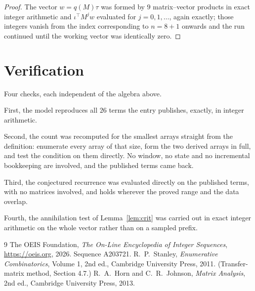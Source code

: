 \documentclass[11pt,a4paper]{article}
\theoremstyle{plain}
\theoremstyle{definition}
\begin{document}
\begin{proof}
The vector $w=q(M)\tau$ was formed by $9$ matrix--vector products in exact integer
arithmetic and $\iota^{\!\top}M^{j}w$ evaluated for $j=0,1,\dots$, again exactly; those
integers vanish from the index corresponding to $n=8+1$ onwards and the run continued
until the working vector was identically zero.
\end{proof}

\section{Verification}

Four checks, each independent of the algebra above.

First, the model reproduces all $26$ terms the entry publishes, exactly, in integer
arithmetic.

Second, the count was recomputed for the smallest arrays straight from the definition:
enumerate every array of that size, form the two derived arrays in full, and test the condition
on them directly. No window, no state and no incremental bookkeeping are involved, and the
published terms came back.

Third, the conjectured recurrence was evaluated directly on the published terms, with no
matrices involved, and holds wherever the proved range and the data overlap.

Fourth, the annihilation test of Lemma~\ref{lem:crit} was carried out in exact integer
arithmetic on the whole vector rather than on a sampled prefix.

\begin{thebibliography}{9}
 The OEIS Foundation, \emph{The On-Line Encyclopedia of Integer
Sequences}, \url{https://oeis.org}, 2026. Sequence A203721.
 R.~P.~Stanley, \emph{Enumerative Combinatorics}, Volume 1, 2nd ed.,
Cambridge University Press, 2011. (Transfer-matrix method, Section 4.7.)
 R.~A.~Horn and C.~R.~Johnson, \emph{Matrix Analysis}, 2nd ed., Cambridge
University Press, 2013.
\end{thebibliography}
\end{document}
